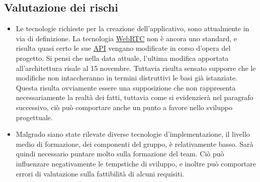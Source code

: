 \subsection{Valutazione dei rischi}
\begin{itemize}
	\item Le tecnologie richieste per la creazione dell'applicativo, sono attualmente in via di definizione. La tecnologia \underline{WebRTC} non è ancora uno standard, e risulta quasi certo le sue \underline{API} vengano modificate in corso d'opera del progetto. Si pensi che nella data attuale, l'ultima modifica apportata all'architettura risale al 15 novembre. Tuttavia risulta sensato supporre che le modifiche non intaccheranno in termini distruttivi le basi già istanziate. Questa risulta ovviamente essere una supposizione che non rappresenta necessariamente la realtà dei fatti, tuttavia come si evidenzierà nel paragrafo successivo, ciò può comportare anche un punto a favore nello sviluppo progettuale.
	\item Malgrado siano state rilevate diverse tecnologie d'implementazione, il livello medio di formazione, dei componenti del gruppo, è relativamente basso. Sarà quindi necessario puntare molto sulla formazione del team. Ciò può influenzare negativamente le tempstiche di sviluppo, e inoltre può comportare errori di valutazione sulla fattibilità di alcuni requisiti.
\end{itemize}

